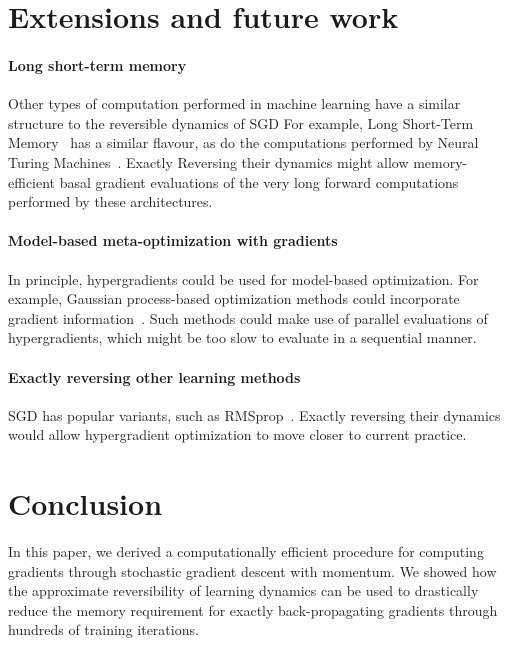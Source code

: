 \documentclass{article}
\newcommand{\primal}{basal}
\begin{document}
\section{Extensions and future work}

\paragraph{Long short-term memory}
Other types of computation performed in machine learning have a similar structure to the reversible dynamics of SGD
For example, Long Short-Term Memory~\citep{hochreiter1997long} has a similar flavour, as do the computations performed by Neural Turing Machines~\citep{graves2014neural}.
Exactly Reversing their dynamics might allow memory-efficient \primal{} gradient evaluations of the very long forward computations performed by these architectures.

\paragraph{Model-based meta-optimization with gradients}
In principle, hypergradients could be used for model-based optimization.
For example, Gaussian process-based optimization methods could incorporate gradient information~\cite{solak2003derivative}.
Such methods could make use of parallel evaluations of hypergradients, which might be too slow to evaluate in a sequential manner.

\paragraph{Exactly reversing other learning methods}
SGD has popular variants, such as RMSprop~\cite{Tieleman2012}.
Exactly reversing their dynamics would allow hypergradient optimization to move closer to current practice.


\section{Conclusion}

In this paper, we derived a computationally efficient procedure for computing gradients through stochastic gradient descent with momentum.
We showed how the approximate reversibility of learning dynamics can be used to drastically reduce the memory requirement for exactly back-propagating gradients through hundreds of training iterations.
\end{document}
